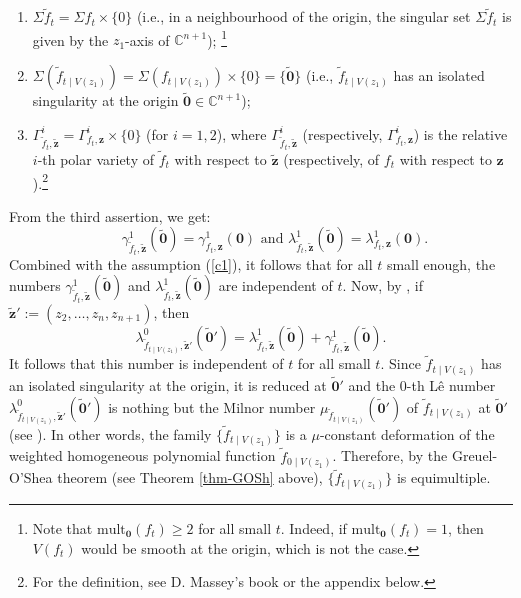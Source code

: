 \documentclass[a4paper,fleqn,11pt]{amsart}
\theoremstyle{definition}
\theoremstyle{remark}
\numberwithin{equation}{section}
\begin{document}
\begin{enumerate}
\item
$\Sigma \tilde f_t=\Sigma f_t\times\{0\}$ (i.e., in a neighbourhood of the origin, the singular set $\Sigma \tilde f_t$ is given by the $z_1$-axis of $\mathbb{C}^{n+1}$); \footnote{Note that $\mbox{mult}_{\mathbf{0}}(f_{t})\geq 2$ for all small $t$. Indeed, if $\mbox{mult}_{\mathbf{0}}(f_{t})=1$, then $V(f_{t})$ would be smooth at the origin, which is not the case.} 
\item
$\Sigma (\tilde f_{t\mid V(z_1)})=\Sigma (f_{t\mid V(z_1)})\times \{0\}=\{\mathbf{\tilde 0}\}$ (i.e., $\tilde f_{t\mid V(z_1)}$ has an isolated singularity at the origin $\tilde{\mathbf{0}}\in\mathbb{C}^{n+1}$);
\item
$\Gamma^i_{\tilde f_t,\tilde{\mathbf{z}}} = 
\Gamma^i_{f_t,\mathbf{z}} \times \{0\}$ (for $i=1,2$), 
where $\Gamma^i_{\tilde f_t,\tilde{\mathbf{z}}}$ (respectively, $\Gamma^i_{f_t,\mathbf{z}}$) is the relative $i$-th polar variety of $\tilde f_t$ with respect to $\tilde{\mathbf{z}}$ (respectively, of $f_t$ with respect to $\mathbf{z}$).\footnote{For the definition, see D. Massey's book \cite{M} or the appendix below.}
\end{enumerate}
From the third assertion, we get:
\begin{equation*}
\qquad \gamma^1_{\tilde f_t,\tilde{\mathbf{z}}}(\tilde{\mathbf{0}}) = 
\gamma^1_{f_t,{\mathbf{z}}}(\mathbf{0})
\mbox{ and }
\lambda^1_{\tilde f_t,\tilde{\mathbf{z}}}(\tilde{\mathbf{0}}) = 
\lambda^1_{{f_t},\mathbf{z}}(\mathbf{0}).
\end{equation*}
Combined with the assumption (\ref{c1}), it follows that for all $t$ small enough, the numbers $\gamma^1_{\tilde f_t,\tilde{\mathbf{z}}}(\tilde{\mathbf{0}})$ and $\lambda^1_{\tilde f_t,\tilde{\mathbf{z}}}(\tilde{\mathbf{0}})$ are independent of $t$. Now, by \cite[Proposition 1.21]{M}, if $\tilde{\mathbf{z}}':=(z_2,\ldots,z_n,z_{n+1})$, then 
\begin{displaymath}
\lambda^0_{\tilde f_{t\mid V(z_1)},\tilde{\mathbf{z}}'} (\tilde{\mathbf{0}}') =
\lambda^1_{\tilde f_t,\tilde{\mathbf{z}}} (\tilde{\mathbf{0}}) + \gamma^1_{\tilde f_t,\tilde{\mathbf{z}}} (\tilde{\mathbf{0}}).
\end{displaymath}
It follows that this number is independent of $t$ for all small $t$. Since $\tilde f_{t\mid V(z_1)}$ has an isolated singularity at the origin, it is reduced at $\tilde{\mathbf{0}}'$ and the $0$-th L\^e number $\lambda^0_{\tilde f_{t\mid V(z_1)},\tilde{\mathbf{z}}'} (\tilde{\mathbf{0}}')$ is nothing but the Milnor number $\mu_{\tilde f_{t\mid V(z_1)}} (\tilde{\mathbf{0}}')$ of $\tilde f_{t\mid V(z_1)}$ at $\tilde{\mathbf{0}}'$ (see \cite[Example 2.1]{M}). In other words, the family $\{\tilde f_{t\mid V(z_1)}\}$ is a $\mu$-constant deformation of the weighted homogeneous polynomial function $\tilde f_{0\mid V(z_1)}$. Therefore, by the Greuel-O'Shea theorem (see Theorem \ref{thm-GOSh} above), $\{\tilde f_{t\mid V(z_1)}\}$ is equimultiple. 
\end{document}
